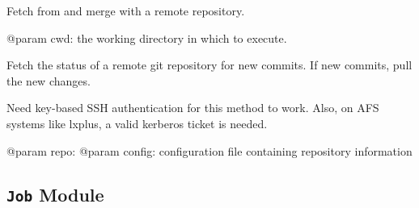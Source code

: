 \documentclass[letterpaper,10pt,english]{sphinxmanual}
\begin{document}
\begin{fulllineitems}
\label{ref-manual/XrdTest:XrdTest.GitUtils.git_pull}
Fetch from and merge with a remote repository.

@param cwd: the working directory in which to execute.

\end{fulllineitems}


\begin{fulllineitems}
\label{ref-manual/XrdTest:XrdTest.GitUtils.sync_remote_git}
Fetch the status of a remote git repository for new commits. If
new commits, pull the new changes.

Need key-based SSH authentication for this method to work. Also, on AFS
systems like lxplus, a valid kerberos ticket is needed.

@param repo: 
@param config: configuration file containing repository information

\end{fulllineitems}



\subsection{\texttt{Job} Module}
\label{ref-manual/XrdTest:job-module}\label{ref-manual/XrdTest:module-XrdTest.Job}
\end{document}
